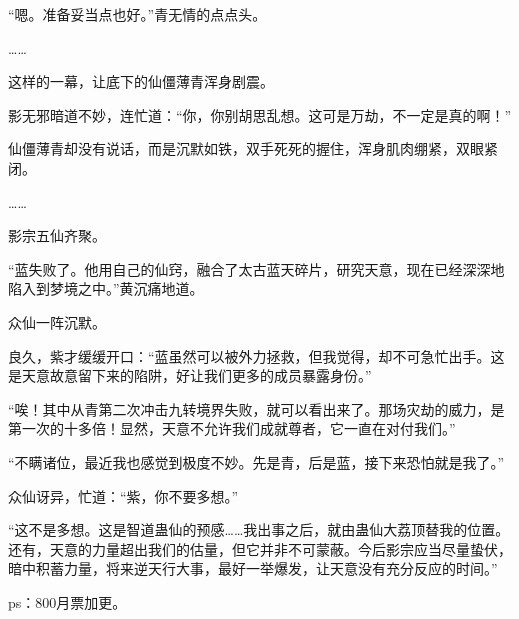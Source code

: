 \begin{this_body}
“嗯。准备妥当点也好。”青无情的点点头。

……

这样的一幕，让底下的仙僵薄青浑身剧震。

影无邪暗道不妙，连忙道：“你，你别胡思乱想。这可是万劫，不一定是真的啊！”

仙僵薄青却没有说话，而是沉默如铁，双手死死的握住，浑身肌肉绷紧，双眼紧闭。

……

影宗五仙齐聚。

“蓝失败了。他用自己的仙窍，融合了太古蓝天碎片，研究天意，现在已经深深地陷入到梦境之中。”黄沉痛地道。

众仙一阵沉默。

良久，紫才缓缓开口：“蓝虽然可以被外力拯救，但我觉得，却不可急忙出手。这是天意故意留下来的陷阱，好让我们更多的成员暴露身份。”

“唉！其中从青第二次冲击九转境界失败，就可以看出来了。那场灾劫的威力，是第一次的十多倍！显然，天意不允许我们成就尊者，它一直在对付我们。”

“不瞒诸位，最近我也感觉到极度不妙。先是青，后是蓝，接下来恐怕就是我了。”

众仙讶异，忙道：“紫，你不要多想。”

“这不是多想。这是智道蛊仙的预感……我出事之后，就由蛊仙大荔顶替我的位置。还有，天意的力量超出我们的估量，但它并非不可蒙蔽。今后影宗应当尽量蛰伏，暗中积蓄力量，将来逆天行大事，最好一举爆发，让天意没有充分反应的时间。”

ps：800月票加更。

\end{this_body}

